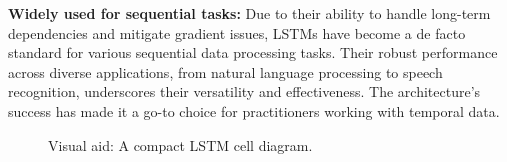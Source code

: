 \textbf{Widely used for sequential tasks:} Due to their ability to handle long-term dependencies and mitigate gradient issues, LSTMs have become a de facto standard for various sequential data processing tasks. Their robust performance across diverse applications, from natural language processing to speech recognition, underscores their versatility and effectiveness. The architecture's success has made it a go-to choice for practitioners working with temporal data.

\begin{figure}[h]
    \centering
    \caption{Visual aid: A compact LSTM cell diagram.}
    \label{fig:lstm_cell_diagram}
\end{figure}

